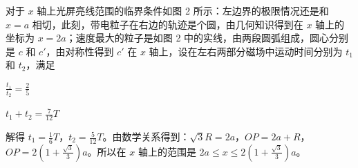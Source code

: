\documentclass[\gkver]{gaokaozhenti}
\begin{document}
\begin{enumerate}
{对于 $x$ 轴上光屏亮线范围的临界条件如图 2 所示：左边界的极限情况还是和 $x=a$ 相切，此刻，带电粒子在右边的轨迹是个圆，由几何知识得到在 $x$ 轴上的坐标为 $x=2a$；速度最大的粒子是如图 2 中的实线，由两段圆弧组成，圆心分别是 $c$ 和 $c'$，由对称性得到 $c'$ 在 $x$ 轴上，设在左右两部分磁场中运动时间分别为 $t_{1}$ 和 $t_{2}$，满足

$\frac{t_{1}}{t_{2}}=\frac{2}{5}$

$t_{1}+t_{2}=\frac{7}{12}T$

解得 $t_{1}=\frac{1}{6}T$，$t_{2}=\frac{5}{12}T$。由数学关系得到：$\sqrt{3}R=2a$，$OP=2a+R$，$OP=2\left(1+\frac{\sqrt{3}}{3}\right)a$。所以在 $x$ 轴上的范围是 $2a\leq x\leq 2\left(1+\frac{\sqrt{3}}{3}\right)a$。


}

\end{enumerate}
\end{document}
